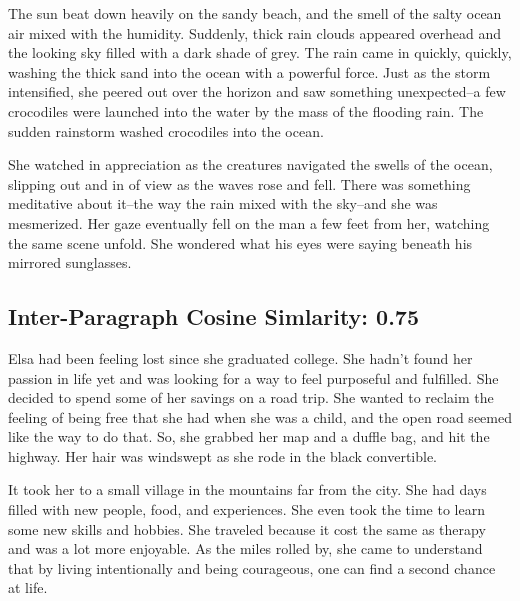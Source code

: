\documentclass[11pt]{article}
\begin{document}
The sun beat down heavily on the sandy beach, and the smell of the salty ocean air mixed with the humidity. Suddenly, thick rain clouds appeared overhead and the looking sky filled with a dark shade of grey. The rain came in quickly, quickly, washing the thick sand into the ocean with a powerful force. Just as the storm intensified, she peered out over the horizon and saw something unexpected--a few crocodiles were launched into the water by the mass of the flooding rain. The sudden rainstorm washed crocodiles into the ocean.

She watched in appreciation as the creatures navigated the swells of the ocean, slipping out and in of view as the waves rose and fell. There was something meditative about it--the way the rain mixed with the sky--and she was mesmerized. Her gaze eventually fell on the man a few feet from her, watching the same scene unfold. She wondered what his eyes were saying beneath his mirrored sunglasses.

\subsection*{Inter-Paragraph Cosine Simlarity: 0.75} %

Elsa had been feeling lost since she graduated college. She hadn't found her passion in life yet and was looking for a way to feel purposeful and fulfilled. She decided to spend some of her savings on a road trip. She wanted to reclaim the feeling of being free that she had when she was a child, and the open road seemed like the way to do that. So, she grabbed her map and a duffle bag, and hit the highway. Her hair was windswept as she rode in the black convertible.

It took her to a small village in the mountains far from the city. She had days filled with new people, food, and experiences. She even took the time to learn some new skills and hobbies. She traveled because it cost the same as therapy and was a lot more enjoyable. As the miles rolled by, she came to understand that by living intentionally and being courageous, one can find a second chance at life.
\end{document}
